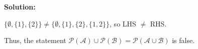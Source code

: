 \documentclass{article}
\newenvironment{solution}
{
\par
\color{blue}
\textbf{Solution:}
}
{
\par
}
\begin{document}
\begin{enumerate}
\begin{solution}
\begin{enumerate}
        $\{\emptyset, \{1\}, \{2\}\} \neq \{\emptyset, \{1\}, \{2\}, \{1, 2\}\}$, so LHS $\neq$ RHS.
        
        Thus, the statement $\mathcal{P(A)} \cup \mathcal{P(B)} = \mathcal{P(A \cup B)}$ is false. \square
    \end{enumerate}
    \end{solution}
    
    
\end{enumerate}
\end{document}
